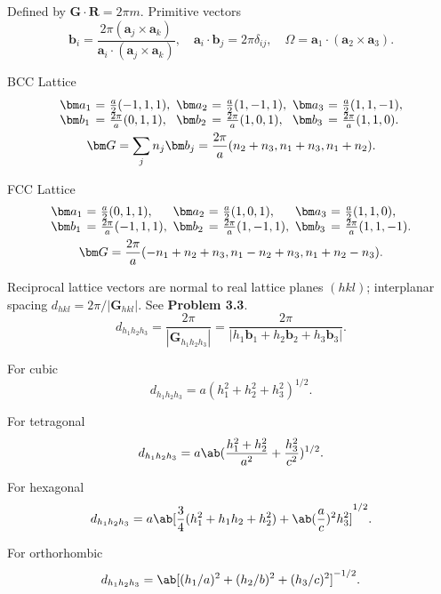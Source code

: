Defined by $\bm G \cdot \bm R = 2\pi m$. Primitive vectors
\[
  \bm b_i = \frac{2\pi (\bm a_j \times \bm a_k)}
    {\bm a_i \cdot (\bm a_j \times \bm a_k)}, \quad
  \bm a_i \cdot \bm b_j = 2\pi \delta_{ij}, \quad
  \Omega = \bm a_1 \cdot (\bm a_2 \times \bm a_3).
\]
\begin{enumext}
  \item BCC Lattice
  \begin{gather*}
  \begin{array}{@{}*2{l@{~}c@{~}l@{\enspace}}l@{~}c@{~}l@{}}
    \bm a_1 & = & \frac a2(-1,1,1),     &
    \bm a_2 & = & \frac a2(1,-1,1),     &
    \bm a_3 & = & \frac a2(1,1,-1),     \\
    \bm b_1 & = & \frac{2\pi}{a}(0,1,1),&
    \bm b_2 & = & \frac{2\pi}{a}(1,0,1),&
    \bm b_3 & = & \frac{2\pi}{a}(1,1,0).
  \end{array}\\
  \bm G = \sum_j n_j\bm b_j = \frac{2\pi}{a}(n_2 + n_3, n_1 + n_3, n_1 + n_2).
  \end{gather*}
  \item FCC Lattice
  \begin{gather*}
  \begin{array}{@{}*2{l@{~}c@{~}l@{\enspace}}l@{~}c@{~}l@{}}
    \bm a_1 & = & \frac a2(0,1,1),     &
    \bm a_2 & = & \frac a2(1,0,1),     &
    \bm a_3 & = & \frac a2(1,1,0),     \\
    \bm b_1 & = & \frac{2\pi}{a}(-1,1,1),&
    \bm b_2 & = & \frac{2\pi}{a}(1,-1,1),&
    \bm b_3 & = & \frac{2\pi}{a}(1,1,-1).
  \end{array}\\
  \bm G = \frac{2\pi}{a}(-n_1 + n_2 + n_3, n_1 - n_2 + n_3, n_1 + n_2 - n_3).
  \end{gather*}
\end{enumext}
Reciprocal lattice vectors are normal to real lattice planes $(hkl)$;
interplanar spacing $d_{hkl} = 2\pi/|\bm G_{hkl}|$. See \textbf{Problem 3.3}.
\[
  d_{h_1h_2h_3} = \frac{2\pi}{|\bm G_{h_1h_2h_3}|}
= \frac{2\pi}{|h_1\bm b_1 + h_2\bm b_2 + h_3\bm b_3|}.
\]
\begin{enumext}
  \item For cubic
  \[
    d_{h_1h_2h_3} = a(h_1^2 + h_2^2 + h_3^2)^{1/2}.
  \]
  \item For tetragonal
  \[
    d_{h_1h_2h_3} = a\ab(\frac{h_1^2 + h_2^2}{a^2} + \frac{h_3^2}{c^2})^{1/2}.
  \]
  \item For hexagonal
  \[
    d_{h_1h_2h_3}
      = a\ab[\frac34(h_1^2 + h_1h_2 + h_2^2) + \ab(\frac ac)^2h_3^2]^{1/2}.
  \]
  \item For orthorhombic
  \[
    d_{h_1h_2h_3} = \ab[(h_1/a)^2 + (h_2/b)^2 + (h_3/c)^2]^{-1/2}.
  \]
\end{enumext}

